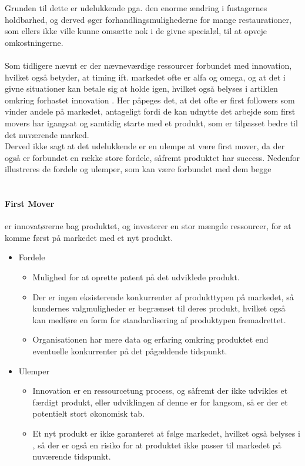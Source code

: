 Grunden til dette er udelukkende pga. den enorme ændring i fustagernes holdbarhed, og derved øger forhandlingsmulighederne for mange restaurationer, som ellers ikke ville
kunne omsætte nok i de givne specialøl, til at opveje omkostningerne.
\\~\\
Som tidligere nævnt er der nævneværdige ressourcer forbundet med innovation, hvilket
også betyder, at timing ift. markedet ofte er alfa og omega, og at det i givne situationer kan betale sig at holde igen, hvilket også belyses i artiklen omkring forhastet innovation \cite[a.1]{eksamensopgave}.
Her påpeges det, at det ofte er first followers som vinder andele på markedet, antageligt fordi de kan udnytte det arbejde som first movers har igangsat og samtidig starte med et produkt, som er tilpasset bedre til det nuværende marked.\\
Derved ikke sagt at det udelukkende er en ulempe at være first mover, da der også er forbundet en række store fordele, såfremt produktet har success. Nedenfor illustreres de fordele og ulemper, som kan være forbundet med dem begge\\
\\\paragraph{First Mover} er innovatørerne bag produktet, og investerer en stor mængde ressourcer, for at komme først på markedet med et nyt produkt.
\begin{itemize}
    \item Fordele
    \begin{itemize}
        \item Mulighed for at oprette patent på det udviklede produkt.
        \item Der er ingen eksisterende konkurrenter af produkttypen på markedet, så kundernes valgmuligheder er begrænset til deres produkt, hvilket også kan medføre en form for standardisering af produktypen fremadrettet.
        \item Organisationen har mere data og erfaring omkring produktet end eventuelle konkurrenter på det pågældende tidspunkt.
    \end{itemize}
    \item Ulemper
    \begin{itemize}
        \item Innovation er en ressourcetung process, og såfremt der ikke udvikles et færdigt produkt, eller udviklingen af denne er for langsom, så er der et potentielt stort økonomisk tab.
        \item Et nyt produkt er ikke garanteret at følge markedet, hvilket også belyses i \cite[a.1]{eksamensopgave}, så der er også en risiko for at produktet ikke passer til markedet på nuværende tidspunkt.
    \end{itemize}
\end{itemize}
